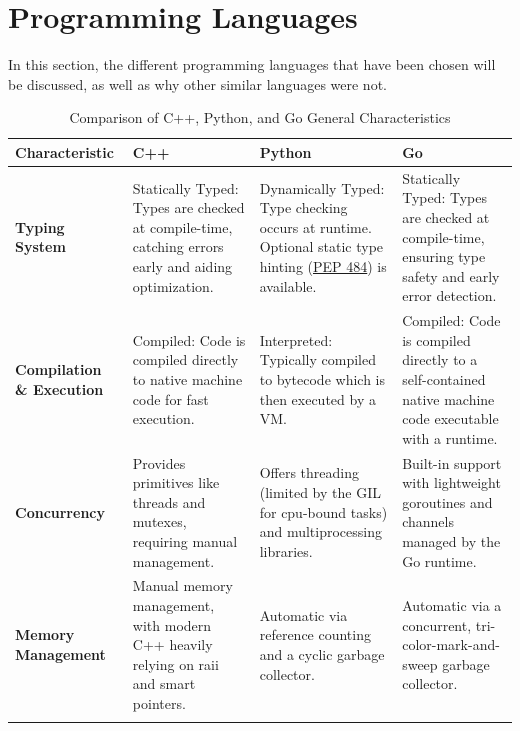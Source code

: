 \section{Programming Languages}

In this section, the different programming languages that have been chosen will be discussed, as well as why other similar languages were not.

\begin{table}
	\centering
	\caption{Comparison of C++, Python, and Go General Characteristics}
	\label{tab:language_comparison}
	\begin{tabularx}{\textwidth}{
		>{\raggedright\arraybackslash}p{}
		>{\raggedright\arraybackslash}X
		>{\raggedright\arraybackslash}X
		>{\raggedright\arraybackslash}X
	}
		\toprule
		\textbf{Characteristic} & \textbf{C++} & \textbf{Python} & \textbf{Go} \\
		\midrule
		
		\textbf{Typing System} &
		Statically Typed: Types are checked at compile-time, catching errors early and aiding optimization. &
		Dynamically Typed: Type checking occurs at runtime. Optional static type hinting (\href{https://peps.python.org/pep-0484/}{PEP 484}) is available. &
		Statically Typed: Types are checked at compile-time, ensuring type safety and early error detection. \\
		\addlinespace
		
		\textbf{Compilation \& Execution} &
		Compiled: Code is compiled directly to native machine code for fast execution. &
		Interpreted: Typically compiled to \gls{bytecode} which is then executed by a \gls{VM}. &
		Compiled: Code is compiled directly to a self-contained native machine code executable with a runtime. \\
		\addlinespace
		
		\textbf{Concurrency} &
		Provides primitives like threads and \gls{mutex}es, requiring manual management. &
		Offers threading (limited by the \gls{GIL} for \gls{cpu}-bound tasks) and multiprocessing libraries. &
		Built-in support with lightweight \glspl{goroutine} and \glspl{channel} managed by the Go runtime. \\
		\addlinespace
		
		\textbf{Memory Management} &
		Manual memory management, with modern C++ heavily relying on \gls{raii} and smart pointers. &
		Automatic via reference counting and a cyclic garbage collector. &
		Automatic via a concurrent, \gls{tri-color-mark-and-sweep} garbage collector. \\
		\addlinespace
		

\end{tabularx}
\end{table}
